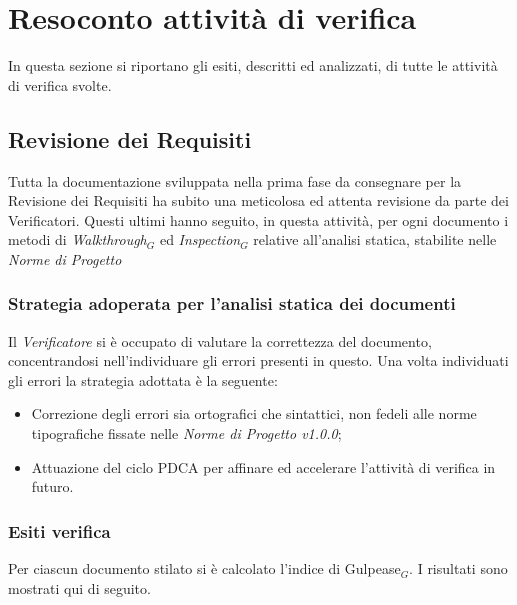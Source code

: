 \chapter{Resoconto attività di verifica } \label{ResocontoAttivitàDiVerifica}
In questa sezione si riportano gli esiti, descritti ed analizzati, di tutte le attività di verifica svolte.
\section{Revisione dei Requisiti}  \label{ResocontoAttivitàDiVerificaRevisioneDeiRequisiti}
Tutta la documentazione sviluppata nella prima fase da consegnare per la Revisione dei Requisiti ha subito una meticolosa ed attenta revisione da parte dei Verificatori. Questi ultimi hanno seguito, in questa attività, per ogni documento i metodi di \textit{Walkthrough$_G$} ed \textit{Inspection$_G$} relative all’analisi statica, stabilite nelle \textit{Norme di Progetto} %
\subsection{Strategia adoperata per l’analisi statica dei documenti} \label{ResocontoAttivitàDiVerificaRevisioneDeiRequisitiStrategiaPerAnalisiStatica}
Il \textit{Verificatore} si è occupato di valutare la correttezza del documento, concentrandosi nell’individuare gli errori presenti in questo. Una volta individuati gli errori la strategia adottata è la seguente: 
\begin{itemize}
	\item Correzione degli errori sia ortografici che sintattici, non fedeli alle norme tipografiche fissate nelle \textit{Norme di Progetto v1.0.0};
	\item Attuazione del ciclo PDCA per affinare ed accelerare l’attività di verifica in futuro.
\end{itemize}

\subsection{Esiti verifica} \label{ResocontoAttivitàDiVerificaRevisioneDeiRequisitiEsitiVerifica}
Per ciascun documento stilato si è calcolato l’indice di Gulpease$_G$. I risultati sono mostrati qui di seguito. 


